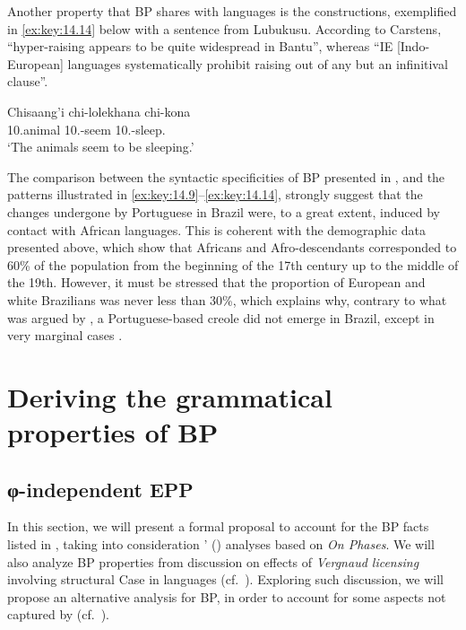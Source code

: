 \documentclass[output=paper]{langsci/langscibook}
\begin{document}
Another property that \gls{BP} shares with  languages is the
 constructions, exemplified in \eqref{ex:key:14.14} below with a
sentence from Lubukusu. According to Carstens, “hyper-raising appears to be
quite widespread in Bantu”, whereas “IE [Indo-European] languages
systematically prohibit raising out of any but an infinitival clause”.

\ea%
    \label{ex:key:14.14}  \parencite[725]{Carstens2011}
    \sn
    \gll  Chisaang’i chi-lolekhana chi-kona\\
          10.animal 10.\Sm{}-seem 10.\Sm{}-sleep.\Prs\\
    \glt  ‘The animals seem to be sleeping.’
\z

The comparison between the syntactic specificities of \gls{BP} presented in
, and the  patterns illustrated in
\eqref{ex:key:14.9}--\eqref{ex:key:14.14}, strongly suggest that the changes
undergone by Portuguese in Brazil were, to a great extent, induced by contact
with African languages. This is coherent with the demographic data presented
above, which show that Africans and Afro-descendants corresponded to 60\% of
the population from the beginning of the 17th century up to the middle of the
19th. However, it must be stressed that the proportion of European and white
Brazilians was never less than 30\%, which explains why, contrary to what was
argued by \citet{Guy1981}, a Portuguese-based creole did not emerge in Brazil,
except in very marginal cases \parencite[70]{Lucchesi2009a}.

\section{Deriving the grammatical properties of BP}\label{sec:key:14.4}

\subsection{φ-independent EPP}\label{sec:key:14.4.1}

In this section, we will present a formal proposal to account for the \gls{BP}
facts listed in , taking into consideration
\citeauthor{AvelarGalves2011}' (\citeyear{AvelarGalves2011,AvelarGalves2016}) analyses based on  \emph{On Phases}.
We will also analyze \gls{BP} properties from
 discussion on effects of \emph{Vergnaud licensing}
involving structural Case in  languages (cf.\ ).
Exploring such discussion, we will propose an alternative analysis for BP, in
order to account for some aspects not captured by
\textcite{AvelarGalves2011,AvelarGalves2016} (cf.\ ).
\end{document}
